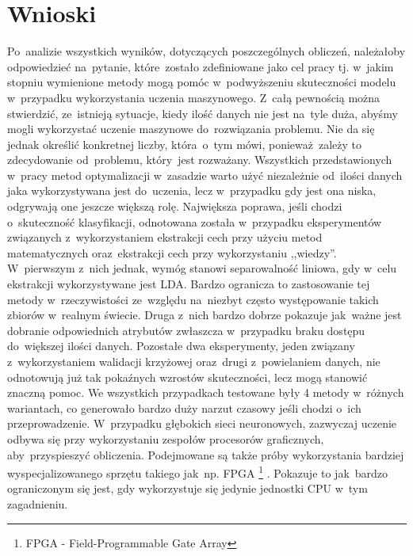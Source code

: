
\section{Wnioski}\label{conclusion}
Po~analizie wszystkich wyników, dotyczących poszczególnych obliczeń, należałoby odpowiedzieć na~pytanie, które~zostało zdefiniowane jako cel pracy tj. w~jakim stopniu wymienione metody mogą pomóc w~podwyższeniu skuteczności modelu w~przypadku wykorzystania uczenia maszynowego. Z~całą pewnością można stwierdzić, ze~istnieją  sytuacje, kiedy ilość danych nie jest na~tyle duża, abyśmy mogli wykorzystać uczenie maszynowe do~rozwiązania problemu. Nie da się jednak określić konkretnej liczby, która~o~tym mówi, ponieważ~zależy to zdecydowanie od~problemu, który~jest rozważany. Wszystkich przedstawionych w~pracy metod optymalizacji w~zasadzie warto użyć niezależnie od~ilości danych jaka wykorzystywana jest do~uczenia, lecz w~przypadku gdy jest ona niska, odgrywają one jeszcze większą rolę. Największa poprawa, jeśli chodzi o~skuteczność klasyfikacji, odnotowana została w~przypadku eksperymentów związanych z~wykorzystaniem ekstrakcji cech przy użyciu metod matematycznych oraz~ekstrakcji cech przy wykorzystaniu ,,wiedzy''. W~pierwszym z~nich jednak, wymóg stanowi separowalność liniowa, gdy w~celu ekstrakcji wykorzystywane jest LDA. Bardzo ogranicza to zastosowanie tej metody w~rzeczywistości ze~względu na~niezbyt często występowanie takich zbiorów w~realnym świecie. Druga z~nich bardzo dobrze pokazuje jak~ważne jest dobranie odpowiednich atrybutów zwłaszcza w~przypadku braku dostępu do~większej ilości danych. Pozostałe dwa eksperymenty, jeden związany z~wykorzystaniem walidacji krzyżowej oraz~drugi z~powielaniem danych, nie odnotowują już tak pokaźnych wzrostów skuteczności, lecz mogą stanowić znaczną pomoc. We wszystkich przypadkach testowane były 4 metody w~różnych wariantach, co generowało bardzo duży narzut czasowy jeśli chodzi o~ich przeprowadzenie. W~przypadku głębokich sieci neuronowych, zazwyczaj uczenie odbywa się przy wykorzystaniu zespołów procesorów graficznych, aby~przyspieszyć obliczenia. Podejmowane są także próby wykorzystania bardziej wyspecjalizowanego sprzętu takiego jak~np. FPGA \footnote{FPGA - Field-Programmable Gate Array} \cite{nurvitadhi2017can}. Pokazuje to jak~bardzo ograniczonym się jest, gdy wykorzystuje się jedynie jednostki CPU w~tym zagadnieniu.

